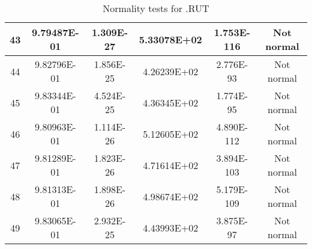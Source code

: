 \begin{table}[h]
\begin{tabular}{|c|c|c|c|c|c|}
		43 & 9.79487E-01 & 1.309E-27 & 5.33078E+02 & 1.753E-116 & Not normal\\\hline
		44 & 9.82796E-01 & 1.856E-25 & 4.26239E+02 & 2.776E-93 & Not normal\\\hline
		45 & 9.83344E-01 & 4.524E-25 & 4.36345E+02 & 1.774E-95 & Not normal\\\hline
		46 & 9.80963E-01 & 1.114E-26 & 5.12605E+02 & 4.890E-112 & Not normal\\\hline
		47 & 9.81289E-01 & 1.823E-26 & 4.71614E+02 & 3.894E-103 & Not normal\\\hline
		48 & 9.81313E-01 & 1.898E-26 & 4.98674E+02 & 5.179E-109 & Not normal\\\hline
		49 & 9.83065E-01 & 2.932E-25 & 4.43993E+02 & 3.875E-97 & Not normal\\\hline
	\end{tabular}
	\caption{Normality tests for .RUT}
	\label{tab:normality_tests_RUT}
\end{table}
